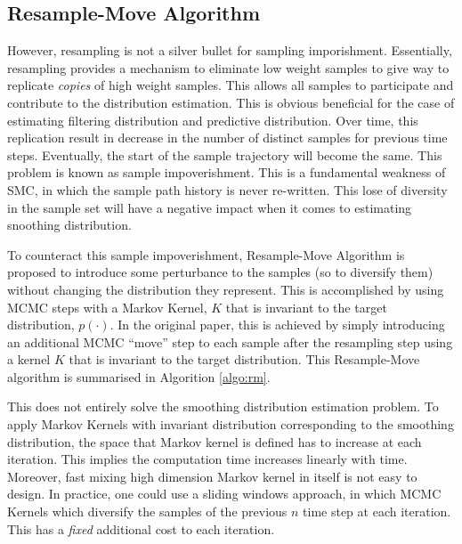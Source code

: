 \subsection{Resample-Move Algorithm}
However, resampling is not a silver bullet for sampling imporishment. Essentially, resampling provides a mechanism to eliminate low weight samples to give way to replicate \emph{copies} of high weight samples. This allows all samples to participate and contribute to the distribution estimation. This is obvious beneficial for the case of estimating filtering distribution and predictive distribution. Over time, this replication result in decrease in the number of distinct samples for previous time steps. Eventually, the start of the sample trajectory will become the same. This problem is known as sample impoverishment. This is a fundamental weakness of SMC, in which the sample path history is never re-written. This lose of diversity in the sample set will have a negative impact when it comes to estimating snoothing distribution. 

To counteract this sample impoverishment, Resample-Move Algorithm \cite{BC01} is proposed to introduce some perturbance to the samples (so to diversify them) without changing the distribution they represent. This is accomplished by using MCMC steps with a Markov Kernel, $K$ that is invariant to the target distribution, $p(\cdot)$. In the original paper, this is achieved by simply introducing an additional MCMC ``move'' step to each sample after the resampling step using a kernel $K$  that is invariant to the target distribution. This Resample-Move algorithm is summarised in Algorition \ref{algo:rm}.

This does not entirely solve the smoothing distribution estimation problem. To apply Markov Kernels with invariant distribution corresponding to the smoothing distribution, the space that Markov kernel is defined has to increase at each iteration. This implies the computation time increases linearly with time. Moreover, fast mixing high dimension Markov kernel in itself is not easy to design. In practice, one could use a sliding windows approach, in which MCMC Kernels which diversify the samples of the previous $n$ time step at each iteration. This has a \emph{fixed} additional cost to each iteration.

